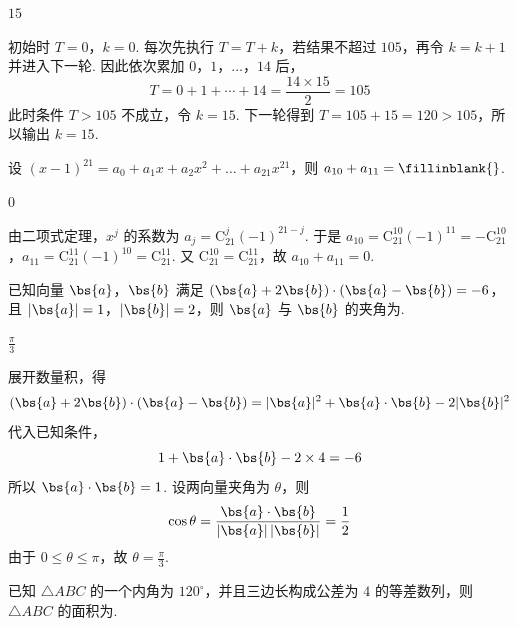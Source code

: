 \begin{answer}
\(15\)
\end{answer}

\begin{solution}
初始时 \(T=0\)，\(k=0\). 每次先执行 \(T=T+k\)，若结果不超过 \(105\)，再令 \(k=k+1\) 并进入下一轮. 因此依次累加 \(0\)，\(1\)，\(\ldots\)，\(14\) 后，
\[
T=0+1+\cdots+14=\frac{14\times15}{2}=105
\]
此时条件 \(T>105\) 不成立，令 \(k=15\). 下一轮得到 \(T=105+15=120>105\)，所以输出 \(k=15\).
\end{solution}

\begin{problem}
设 \((x - 1)^{21} = a_0 + a_1x + a_2x^2 + \dots + a_{21}x^{21}\)，则 \(a_{10} + a_{11} =\fillinblank{}\).
\end{problem}

\begin{answer}
\(0\)
\end{answer}

\begin{solution}
由二项式定理，\(x^j\) 的系数为 \(a_j=\mathrm C_{21}^{j}(-1)^{21-j}\). 于是
\(a_{10}=\mathrm C_{21}^{10}(-1)^{11}=-\mathrm C_{21}^{10}\)，\(a_{11}=\mathrm C_{21}^{11}(-1)^{10}=\mathrm C_{21}^{11}\).
又 \(\mathrm C_{21}^{10}=\mathrm C_{21}^{11}\)，故 \(a_{10}+a_{11}=0\).
\end{solution}

\begin{problem}
已知向量 \(\bs{a}\)，\(\bs{b}\) 满足 \((\bs{a} + 2\bs{b}) \cdot (\bs{a} - \bs{b}) = -6\)，且 \(|\bs{a}| = 1\)，\(|\bs{b}| = 2\)，则 \(\bs{a}\) 与 \(\bs{b}\) 的夹角为\fillinblank{}.
\end{problem}

\begin{answer}
\(\frac{\pi}{3}\)
\end{answer}

\begin{solution}
展开数量积，得
\[
(\bs{a}+2\bs{b})\cdot(\bs{a}-\bs{b})=|\bs{a}|^2+\bs{a}\cdot\bs{b}-2|\bs{b}|^2
\]
代入已知条件，
\[
1+\bs{a}\cdot\bs{b}-2\times4=-6
\]
所以 \(\bs{a}\cdot\bs{b}=1\). 设两向量夹角为 \(\theta\)，则
\[
\cos\theta=\frac{\bs{a}\cdot\bs{b}}{|\bs{a}|\,|\bs{b}|}=\frac12
\]
由于 \(0\leqslant\theta\leqslant\pi\)，故 \(\theta=\frac{\pi}{3}\).
\end{solution}

\begin{problem}
已知 \(\triangle ABC\) 的一个内角为 \(120^{\circ}\)，并且三边长构成公差为 \(4\) 的等差数列，则 \(\triangle ABC\) 的面积为\fillinblank{}.
\end{problem}

